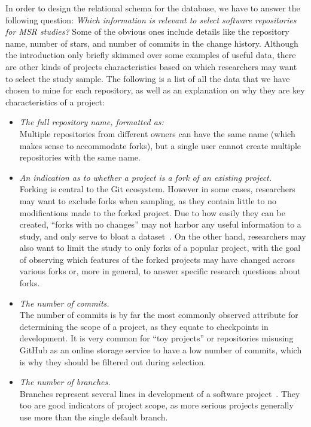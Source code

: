 In order to design the relational schema for the database, we have to answer the following question: \emph{Which information is relevant to select software repositories for MSR studies?}
Some of the obvious ones include details like the repository name, number of stars, and number of commits in the change history.
Although the introduction only briefly skimmed over some examples of useful data, there are other kinds of projects characteristics based on which researchers may want to select the study sample.
The following is a list of all the data that we have chosen to mine for each repository, as well as an explanation on why they are key characteristics of a project:
\begin{itemize}
    \item \textit{The full repository name, formatted as:} 
    \\Multiple repositories from different owners can have the same name (which makes sense to accommodate forks), but a single user cannot create multiple repositories with the same name.
    \item \textit{An indication as to whether a project is a fork of an existing project.}
    \\Forking is central to the Git ecosystem. However in some cases, researchers may want to exclude forks when sampling, as they contain little to no modifications made to the forked project. Due to how easily they can be created, ``forks with no changes'' may not harbor any useful information to a study, and only serve to bloat a dataset~\cite{FORKS}. On the other hand, researchers may also want to limit the study to only forks of a popular project, with the goal of observing which features of the forked projects may have changed across various forks or, more in general, to answer specific research questions about forks.
    \item \textit{The number of commits.}
    \\The number of commits is by far the most commonly observed attribute for determining the scope of a project, as they equate to checkpoints in development. It is very common for ``toy projects'' or repositories misusing GitHub as an online storage service to have a low number of commits, which is why they should be filtered out during selection.
    \item \textit{The number of branches.}
    \\Branches represent several lines in development of a software project~\cite{GIT}. They too are good indicators of project scope, as more serious projects generally use more than the single default branch.

\end{itemize}

